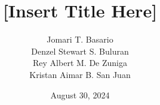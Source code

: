 \documentclass[10pt,a4paper]{article}
\title{[Insert Title Here]}
\author{Jomari T. Basario \\Denzel Stewart S. Buluran \\Rey Albert M. De Zuniga \\Kristan Aimar B. San Juan}
\date{August 30, 2024}
\begin{document}
	\begin{titlingpage}
	\maketitle
	\end{titlingpage}
	
	\newpage
	\tableofcontents
	
	\newpage
	
	
	\newpage
	
	
	\newpage
	
	
	\newpage
	
	
\end{document}
